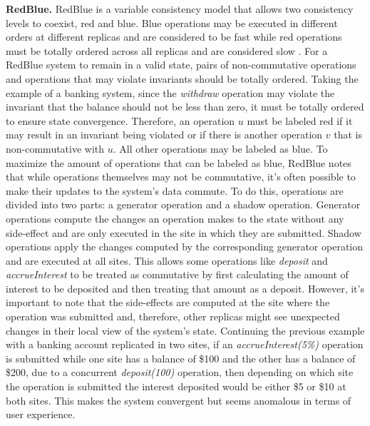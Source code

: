 \textbf{RedBlue.} RedBlue is a variable consistency model that allows two consistency levels to coexist, red and blue. Blue operations may be executed in different orders at different replicas and are considered to be fast while red operations must be totally ordered across all replicas and are considered slow \cite{Li2012}. For a RedBlue system to remain in a valid state, pairs of non-commutative operations and operations that may violate invariants should be totally ordered. Taking the example of a banking system, since the \textit{withdraw} operation may violate the invariant that the balance should not be less than zero, it must be totally ordered to ensure state convergence. Therefore, an operation $u$ must be labeled red if it may result in an invariant being violated or if there is another operation $v$ that is non-commutative with $u$. All other operations may be labeled as blue. To maximize the amount of operations that can be labeled as blue, RedBlue notes that while operations themselves may not be commutative, it's often possible to make their updates to the system's data commute. To do this, operations are divided into two parts: a generator operation and a shadow operation. Generator operations compute the changes an operation makes to the state without any side-effect and are only executed in the site in which they are submitted. Shadow operations apply the changes computed by the corresponding generator operation and are executed at all sites. This allows some operations like \textit{deposit} and \textit{accrueInterest} to be treated as commutative by first calculating the amount of interest to be deposited and then treating that amount as a deposit.  However, it's important to note that the side-effects are computed at the site where the operation was submitted and, therefore, other replicas might see unexpected changes in their local view of the system's state. Continuing the previous example with a banking account replicated in two sites, if an \textit{accrueInterest(5\%)} operation is submitted while one site has a balance of \$100 and the other has a balance of \$200, due to a concurrent \textit{deposit(100)} operation, then depending on which site the operation is submitted the interest deposited would be either \$5 or \$10 at both sites. This makes the system convergent but seems anomalous in terms of user experience.\par

